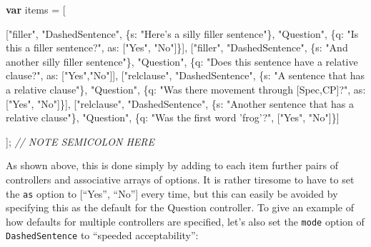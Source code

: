 \documentclass[]{article}
\newenvironment{Shaded}{}{}
\newcommand{\KeywordTok}[1]{\textcolor[rgb]{0.00,0.44,0.13}{\textbf{{#1}}}}
\newcommand{\DataTypeTok}[1]{\textcolor[rgb]{0.56,0.13,0.00}{{#1}}}
\newcommand{\StringTok}[1]{\textcolor[rgb]{0.25,0.44,0.63}{{#1}}}
\newcommand{\CommentTok}[1]{\textcolor[rgb]{0.38,0.63,0.69}{\textit{{#1}}}}
\newcommand{\NormalTok}[1]{{#1}}
\begin{document}
\begin{Shaded}
\begin{Highlighting}[]
    \KeywordTok{var} \NormalTok{items = [}

    \NormalTok{[}\StringTok{"filler"}\NormalTok{, }\StringTok{"DashedSentence"}\NormalTok{, \{}\DataTypeTok{s}\NormalTok{: }\StringTok{"Here's a silly filler sentence"}\NormalTok{\},}
               \StringTok{"Question"}\NormalTok{, \{}\DataTypeTok{q}\NormalTok{: }\StringTok{"Is this a filler sentence?"}\NormalTok{, }\DataTypeTok{as}\NormalTok{: [}\StringTok{"Yes"}\NormalTok{, }\StringTok{"No"}\NormalTok{]\}],}
    \NormalTok{[}\StringTok{"filler"}\NormalTok{, }\StringTok{"DashedSentence"}\NormalTok{, \{}\DataTypeTok{s}\NormalTok{: }\StringTok{"And another silly filler sentence"}\NormalTok{\},}
               \StringTok{"Question"}\NormalTok{, \{}\DataTypeTok{q}\NormalTok{: }\StringTok{"Does this sentence have a relative clause?"}\NormalTok{, }\DataTypeTok{as}\NormalTok{: [}\StringTok{"Yes"}\NormalTok{,}\StringTok{"No"}\NormalTok{]],}
    \NormalTok{[}\StringTok{"relclause"}\NormalTok{, }\StringTok{"DashedSentence"}\NormalTok{, \{}\DataTypeTok{s}\NormalTok{: }\StringTok{"A sentence that has a relative clause"}\NormalTok{\},}
                  \StringTok{"Question"}\NormalTok{, \{}\DataTypeTok{q}\NormalTok{: }\StringTok{"Was there movement through [Spec,CP]?"}\NormalTok{, }\DataTypeTok{as}\NormalTok{: [}\StringTok{"Yes"}\NormalTok{, }\StringTok{"No"}\NormalTok{]\}],}
    \NormalTok{[}\StringTok{"relclause"}\NormalTok{, }\StringTok{"DashedSentence"}\NormalTok{, \{}\DataTypeTok{s}\NormalTok{: }\StringTok{"Another sentence that has a relative clause"}\NormalTok{\},}
                  \StringTok{"Question"}\NormalTok{, \{}\DataTypeTok{q}\NormalTok{: }\StringTok{"Was the first word 'frog'?"}\NormalTok{, [}\StringTok{"Yes"}\NormalTok{, }\StringTok{"No"}\NormalTok{]\}]}

    \NormalTok{]; }\CommentTok{// NOTE SEMICOLON HERE}
\end{Highlighting}
\end{Shaded}

As shown above, this is done simply by adding to each item further pairs
of controllers and associative arrays of options. It is rather tiresome
to have to set the \texttt{as} option to {[}``Yes'', ``No''{]} every
time, but this can easily be avoided by specifying this as the default
for the Question controller. To give an example of how defaults for
multiple controllers are specified, let's also set the \texttt{mode}
option of \texttt{DashedSentence} to ``speeded acceptability'':
\end{document}
